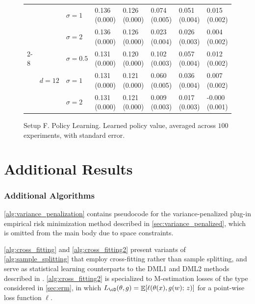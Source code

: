 \documentclass[11pt]{article} %
\newcommand{\pref}[1]{\cref{#1}}
\theoremstyle{theorem}  %
\theoremstyle{plain}
\DeclarePairedDelimiter{\brk}{[}{]}
\DeclareMathOperator{\En}{\mathbb{E}}
\newcommand{\ls}{\ell}
\newcommand{\midsem}{;\,}
\newcommand{\poprisk}{L_{\cD}}
\begin{document}
\begin{figure}[H]
\begin{tabular}{llllllll}
         &        & $\sigma=1$ &  0.136 (0.000) &  0.126 (0.000) &  0.074 (0.005) &  0.051 (0.004) &   0.015 (0.002) \\
         &        & $\sigma=2$ &  0.136 (0.000) &  0.126 (0.000) &  0.023 (0.004) &  0.026 (0.003) &   0.004 (0.002) \\
\cline{2-8}
         & \multirow{3}{*}{$d=12$} & $\sigma=0.5$ &  0.131 (0.000) &  0.120 (0.000) &  0.102 (0.003) &  0.057 (0.004) &   0.012 (0.002) \\
         &        & $\sigma=1$ &  0.131 (0.000) &  0.121 (0.000) &  0.060 (0.005) &  0.036 (0.004) &   0.007 (0.002) \\
         &        & $\sigma=2$ &  0.131 (0.000) &  0.121 (0.000) &  0.009 (0.003) &  0.017 (0.003) &  -0.000 (0.001) \\
\bottomrule
\end{tabular}

\caption{Setup F. Policy Learning. Learned policy value, averaged across $100$ experiments, with standard error.}
\label{fig:setupF-policy}
\end{figure}


%
%

%

%



%





%
%
%
%
 

\part{Additional Results}
\label{part:additional}

\section{Additional Algorithms}
\label{app:additional_algorithms}
%
%

%

\pref{alg:variance_penalization} contains pseudocode for the variance-penalized plug-in empirical risk minimization method described in \pref{sec:variance_penalized}, which is omitted from the main body due to space constraints.

\pref{alg:cross_fitting} and \pref{alg:cross_fitting2} present variants of \pref{alg:sample_splitting} that employ cross-fitting rather than sample splitting, and serve as statistical learning counterparts to the DML1 and DML2 methods described in \cite{chernozhukov2016double}. \pref{alg:cross_fitting2} is specialized to M-estimation losses of the type considered in \pref{sec:erm}, in which $\poprisk(\theta,g)=\En\brk*{\ls(\theta(x),g(w)\midsem{}z)}$ for a point-wise loss function $\ls$. 
\end{document}
